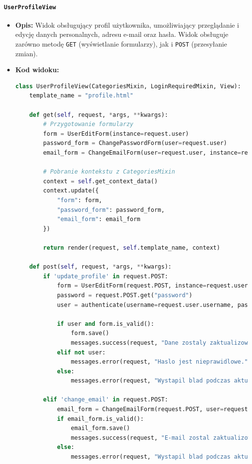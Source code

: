 \documentclass[12pt,a4paper,oneside]{article}
\theoremstyle{definition}
\numberwithin{equation}{section}
\begin{document}
\paragraph{\texttt{UserProfileView}}
    \begin{itemize}
        \item \textbf{Opis:} Widok obsługujący profil użytkownika, umożliwiający przeglądanie i edycję danych personalnych, adresu e-mail oraz hasła. Widok obsługuje zarówno metodę \texttt{GET} (wyświetlanie formularzy), jak i \texttt{POST} (przesyłanie zmian).
        \item \textbf{Kod widoku:}
    \begin{lstlisting}[language=Python, caption=UserProfileView]
class UserProfileView(CategoriesMixin, LoginRequiredMixin, View):
    template_name = "profile.html"

    def get(self, request, *args, **kwargs):
        # Przygotowanie formularzy
        form = UserEditForm(instance=request.user)
        password_form = ChangePasswordForm(user=request.user)
        email_form = ChangeEmailForm(user=request.user, instance=request.user)

        # Pobranie kontekstu z CategoriesMixin
        context = self.get_context_data()
        context.update({
            "form": form,
            "password_form": password_form,
            "email_form": email_form
        })

        return render(request, self.template_name, context)

    def post(self, request, *args, **kwargs):
        if 'update_profile' in request.POST:
            form = UserEditForm(request.POST, instance=request.user)
            password = request.POST.get("password")
            user = authenticate(username=request.user.username, password=password)

            if user and form.is_valid():
                form.save()
                messages.success(request, "Dane zostaly zaktualizowane.")
            elif not user:
                messages.error(request, "Haslo jest nieprawidlowe.")
            else:
                messages.error(request, "Wystapil blad podczas aktualizacji.")

        elif 'change_email' in request.POST:
            email_form = ChangeEmailForm(request.POST, user=request.user, instance=request.user)
            if email_form.is_valid():
                email_form.save()
                messages.success(request, "E-mail zostal zaktualizowany.")
            else:
                messages.error(request, "Wystapil blad podczas aktualizacji e-maila.")


\end{lstlisting}
\end{itemize}
\end{document}
